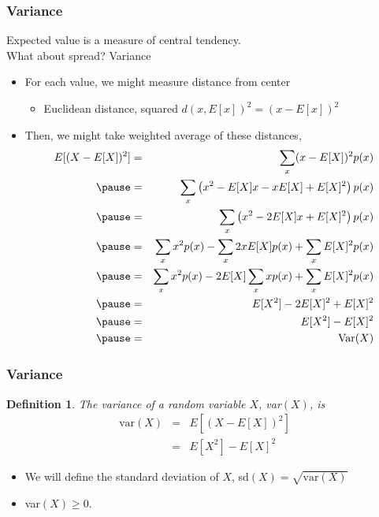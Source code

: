 \documentclass{beamer}
\newtheorem{defn}{Definition}
\numberwithin{equation}{section}
\begin{document}
\begin{frame}
\frametitle{Variance} 

Expected value is a measure of \alert{central tendency}. \pause \\
What about spread? \pause  \alert{Variance}  \pause \\
\begin{itemize}
\item[-] For each value, we might measure distance from center \pause 
\begin{itemize}
\item[-] Euclidean distance, squared $d(x, E[x])^{2} = (x - E[x])^2$  \pause 
\end{itemize}
\item[-] Then, we might take weighted average of these distances,  \pause 
\tiny{
\begin{eqnarray} 
E[(X - E[X])^2] & = & \sum_{x} (x  - E[X])^2p(x) \nonumber \\  \pause 
& = & \sum_{x} \left(x^2  -E[X] x -x E[X] + E[X]^2\right) p(x) \nonumber \\  \pause 
& = & \sum_{x} \left(x^2  -2E[X] x  + E[X]^2\right) p(x) \nonumber \\  \pause 
& = & \sum_{x} x^2 p(x)   - \sum_{x} 2x E[X]p(x) + \sum_{x} E[X]^2 p(x) \nonumber \\  \pause 
& = & \sum_{x} x^2 p(x)   - 2E[X] \sum_{x} x p(x) + \sum_{x} E[X]^2 p(x) \nonumber \\  \pause 
&  = &  E[X^2] - 2E[X]^2 + E[X]^2  \nonumber \\ \pause 
& = & E[X^2] - E[X]^2 \nonumber \\ \pause 
& = & \text{Var}(X) \nonumber 
\end{eqnarray}
}
\end{itemize}

\end{frame}


\begin{frame}
\frametitle{Variance}

\begin{defn}
The variance of a random variable $X$, var$(X)$, is 
\begin{eqnarray}
 \text{var}(X) & = & E[(X - E[X])^2] \nonumber \\
 & = &  E[X^2] - E[X]^2 \nonumber 
\end{eqnarray}
\end{defn}

\begin{itemize}
\item[-] We will define the standard deviation of $X$, sd$(X) = \sqrt{\text{var}(X)} $
\item[-] var$(X) \geq 0$.  
\end{itemize}


\end{frame}
\end{document}
